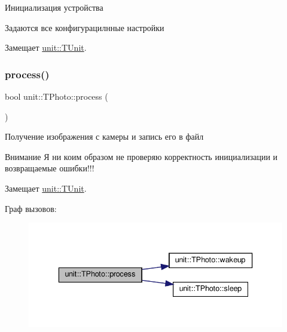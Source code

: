 Инициализация устройства 



 Задаются все конфигурацилнные настройки 

Замещает \hyperlink{classunit_1_1_t_unit_afc001dd57ba88e571e6b650a416b76a5}{unit\+::\+T\+Unit}.

\mbox{\label{classunit_1_1_t_photo_a8323fa27bff29d883e9903b74c341605}} 
\subsubsection{\texorpdfstring{process()}{process()}}
{\footnotesize\ttfamily bool unit\+::\+T\+Photo\+::process (\begin{DoxyParamCaption}{ }\end{DoxyParamCaption})\hspace{0.3cm}{\ttfamily [virtual]}}



Получение изображения с камеры и запись его в файл 



 \begin{DoxyAttention}{Внимание}
Я ни коим образом не проверяю корректность инициализации и возвращаемые ошибки!!! 
\end{DoxyAttention}


Замещает \hyperlink{classunit_1_1_t_unit_a108691c8b988d97c65237c83a31db706}{unit\+::\+T\+Unit}.

Граф вызовов\+:\nopagebreak
\begin{figure}[H]
\begin{center}
\leavevmode
\includegraphics[width=336pt]{classunit_1_1_t_photo_a8323fa27bff29d883e9903b74c341605_cgraph}
\end{center}
\end{figure}
\mbox{\label{classunit_1_1_t_photo_acfdae485260a64864e779cacd15644f7}} 

